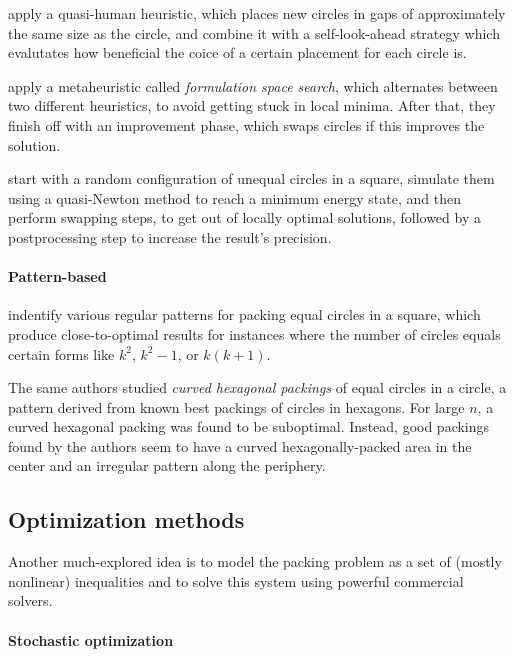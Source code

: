 \documentclass[a4paper,style=print,bibliography=totoc,nexus,lnum,extramargin]{tubsbook}
\begin{document}
\textcite{HLLX2006new} apply a quasi-human heuristic, which places new circles in gaps of approximately the same size as the circle, and combine it with a self-look-ahead strategy which evalutates how beneficial the coice of a certain placement for each circle is.

\textcite{LB2013packing} apply a metaheuristic called \emph{formulation space search}, which alternates between two different heuristics, to avoid getting stuck in local minima. After that, they finish off with an improvement phase, which swaps circles if this improves the solution.

\textcite{HHY2015action} start with a random configuration of unequal circles in a square, simulate them using a quasi-Newton method to reach a minimum energy state, and then perform swapping steps, to get out of locally optimal solutions, followed by a postprocessing step to increase the result's precision.

\paragraph{Pattern-based}

\textcite{GL1996repeated} indentify various regular patterns for packing equal circles in a square, which produce close-to-optimal results for instances where the number of circles equals certain forms like $k^2$, $k^2-1$, or $k(k+1)$.

The same authors \cite{lubachevsky1997curved} studied \emph{curved hexagonal packings} of equal circles in a circle, a pattern derived from known best packings of circles in hexagons. For large $n$, a curved hexagonal packing was found to be suboptimal. Instead, good packings found by the authors seem to have a curved hexagonally-packed area in the center and an irregular pattern along the periphery.

\subsection{Optimization methods}

Another much-explored idea is to model the packing problem as a set of (mostly nonlinear) inequalities and to solve this system using powerful commercial solvers.

\paragraph{Stochastic optimization}
\end{document}
